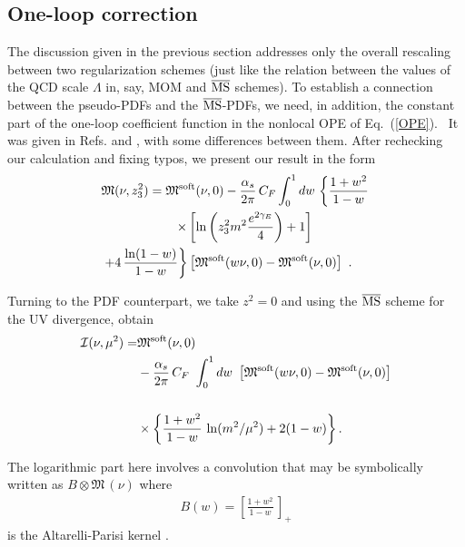 \subsection{One-loop correction}

The  discussion given in the  previous section   addresses  only the
overall  rescaling between  two regularization schemes
(just like    the  relation between the values of the QCD scale $\Lambda$ in, say, MOM and
$\overline{\rm MS}$ schemes).
To  establish a connection  between the pseudo-PDFs and  the
$\overline{\rm MS}$-PDFs, we  need, in addition, the constant part of the one-loop
coefficient function in the nonlocal OPE of  \mbox{Eq. (\ref{OPE}).  }
It   was given  in Refs. \cite{Ji:2017rah} and \cite{Radyushkin:2017lvu},
with some differences between them.
After rechecking our calculation and fixing  typos,
we present our result  in the form
  \begin{align}
  &
{\mathfrak M}  (\nu, z_3^2)    = {\mathfrak  M}^{\rm soft}  ( \nu, 0)  -  \frac{\alpha_s}{2\pi} \, C_F
\int_0^1  dw \,  \left \{   \frac{1+w^2} {1-w}    \right.  \nonumber \\  & \left.  \hspace{2cm} \times
  \left [  \ln \left (z_3^2m^2\frac{  e^{2\gamma_E}}{4} \right )   +1 \right ]
\right. \nonumber \\     & \left.
+ 4  \,  \frac{\ln (1-w)}{1-w}
\right \}  \left [
{\mathfrak  M}^{\rm soft}  (w \nu,0) -  {\mathfrak  M}^{\rm soft}  ( \nu,0) \right ]\  .
 \label{Mhard}
 \end{align}



Turning to the PDF counterpart, we take $z^2=0$ and using the  $\overline{\rm MS}$ scheme for the UV divergence, obtain
   \begin{align}
{\cal I}  (\nu, \mu^2)
  =&  {\mathfrak  M}^{\rm soft}  ( \nu, 0) \nonumber \\  & -  \frac{\alpha_s}{2\pi} \, C_F\
    \int_0^1  dw \
  \left [
{\mathfrak  M}^{\rm soft}  (w \nu, 0) -  {\mathfrak  M}^{\rm soft}  ( \nu, 0) \right ]\nonumber \\  &
  \nonumber \\  & \times \left \{    \frac{1+w^2} {1-w} \,  \ln (m^2/ \mu^2)   + 2 (1-w) \right \}
.
\label{Msbar}
 \end{align}

The logarithmic part here involves a convolution that  may be symbolically written as
   $
B \otimes {\mathfrak M}\,  (\nu) $ where
     \begin{align}
B(w) =
\left [ \frac{1+w^2}{1- w} \, \right ]_+
\label{AP}
 \end{align}
 is  the Altarelli-Parisi kernel  \cite{Altarelli:1977zs}.

